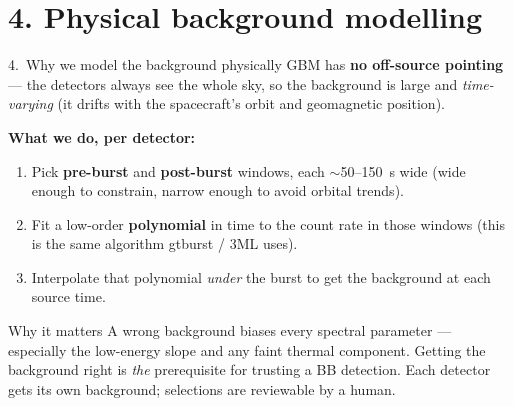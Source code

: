 \documentclass[aspectratio=169,11pt]{beamer}
\begin{document}
\section{4. Physical background modelling}
\begin{frame}{4.\ Why we model the background physically}
\small
GBM has \textbf{no off-source pointing} --- the detectors always see the whole
sky, so the background is large and \emph{time-varying} (it drifts with the
spacecraft's orbit and geomagnetic position).
\medskip

\textbf{What we do, per detector:}
\begin{enumerate}
  \item Pick \textbf{pre-burst} and \textbf{post-burst} windows, each $\sim$50--150~s
        wide (wide enough to constrain, narrow enough to avoid orbital trends).
  \item Fit a low-order \textbf{polynomial} in time to the count rate in those
        windows (this is the same algorithm gtburst / 3ML uses).
  \item Interpolate that polynomial \emph{under} the burst to get the background
        at each source time.
\end{enumerate}
\begin{block}{Why it matters}
A wrong background biases every spectral parameter --- especially the
low-energy slope and any faint thermal component. Getting the background right is
\emph{the} prerequisite for trusting a BB detection. Each detector gets its own
background; selections are reviewable by a human.
\end{block}
\end{frame}

\end{document}
